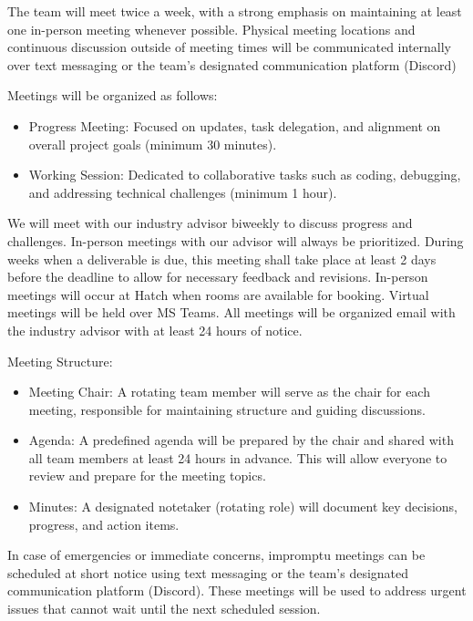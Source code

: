 \documentclass{article}
\begin{document}
The team will meet twice a week, with a strong emphasis on maintaining at least one in-person meeting whenever possible. Physical meeting locations and continuous discussion outside of meeting times will be communicated internally over text messaging or the team’s designated communication platform (Discord)\par

Meetings will be organized as follows:

\begin{itemize}
  \item Progress Meeting: Focused on updates, task delegation, and alignment on overall project goals (minimum 30 minutes).
  \item Working Session: Dedicated to collaborative tasks such as coding, debugging, and addressing technical challenges (minimum 1 hour).
\end{itemize}

\begin{flushleft}
  We will meet with our industry advisor biweekly to discuss progress and challenges. In-person meetings with our advisor will always be prioritized. During weeks when a deliverable is due, this meeting shall take place at least 2 days before the deadline to allow for necessary feedback and revisions. 
  In-person meetings will occur at Hatch when rooms are available for booking.
  Virtual meetings will be held over MS Teams. All meetings will be organized email with the industry advisor with at least 24 hours of notice.\par

  Meeting Structure:
\end{flushleft}

\begin{itemize}
  \item Meeting Chair: A rotating team member will serve as the chair for each meeting, responsible for maintaining structure and guiding discussions.
  \item Agenda: A predefined agenda will be prepared by the chair and shared with all team members at least 24 hours in advance. This will allow everyone to review and prepare for the meeting topics.
  \item Minutes: A designated notetaker (rotating role) will document key decisions, progress, and action items.
\end{itemize}

In case of emergencies or immediate concerns, impromptu meetings can be scheduled at short notice using text messaging or the team’s designated communication platform (Discord). These meetings will be used to address urgent issues that cannot wait until the next scheduled session.
\end{document}
